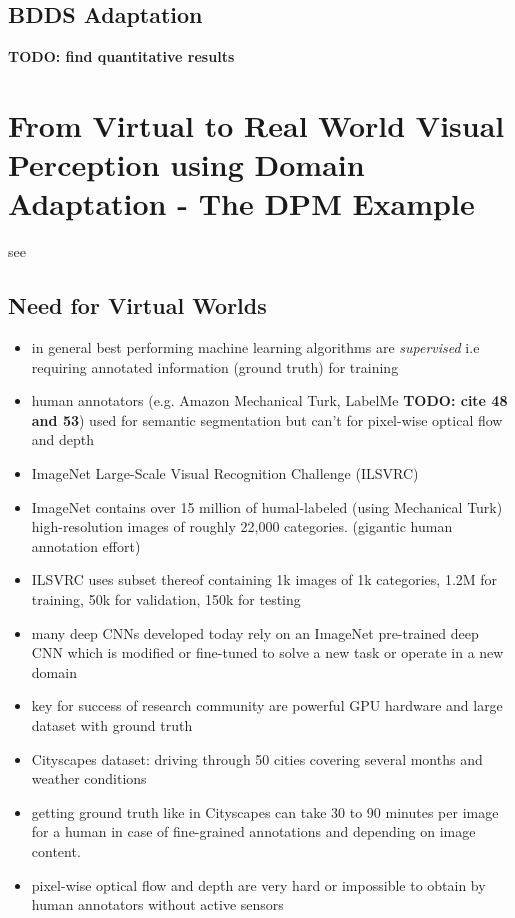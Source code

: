 \documentclass[]{article}
\newcommand{\todo}[1]{{\color{red}\bf{TODO: #1}}}
\begin{document}
\subsection{BDDS Adaptation}
\todo{find quantitative results}

\section{From Virtual to Real World Visual Perception using Domain Adaptation - The DPM Example}

see \cite{DBLP:journals/corr/LopezXGVR16}

\subsection{Need for Virtual Worlds}
\begin{itemize}
	\item in general best performing machine learning algorithms are \textit{supervised} i.e requiring annotated information (ground truth) for training
	\item human annotators (e.g. Amazon Mechanical Turk, LabelMe \todo{cite 48 and 53}) used for semantic segmentation but can't for pixel-wise optical flow and depth
	\item ImageNet Large-Scale Visual Recognition Challenge (ILSVRC)
	\item ImageNet contains over 15 million of humal-labeled (using Mechanical Turk) high-resolution images of roughly 22,000 categories. (gigantic human annotation effort)
	\item ILSVRC uses subset thereof containing 1k images of 1k categories, 1.2M for training, 50k for validation, 150k for testing
	\item many deep CNNs developed today rely on an ImageNet pre-trained deep CNN which is modified or fine-tuned to solve a new task or operate in a new domain
	\item key for success of research community are powerful GPU hardware and large dataset with ground truth
	\item Cityscapes dataset: driving through 50 cities covering several months and weather conditions
	\item getting ground truth like in Cityscapes can take 30 to 90 minutes per image for a human in case of fine-grained annotations and depending on image content.
	\item pixel-wise optical flow and depth are very hard or impossible to obtain by human annotators without active sensors

\end{itemize}
\end{document}

